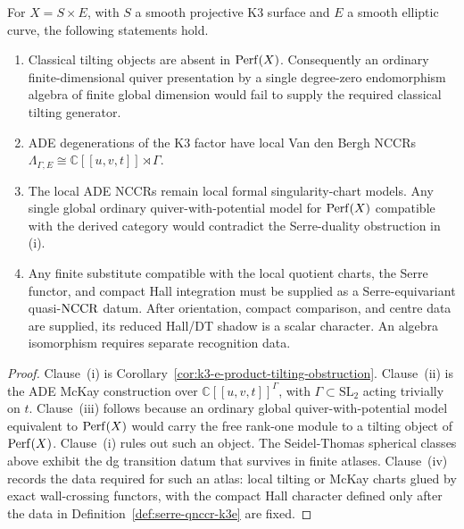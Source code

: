 \begin{theorem}
\label{thm:finite-quiver-obstruction-K3E}
For \(X=S\times E\), with \(S\) a smooth projective K3 surface and
\(E\) a smooth elliptic curve, the following statements hold.
\begin{enumerate}
\item[\textup{(i)}] Classical tilting objects are absent in
\(\mathrm{Perf}(X)\).  Consequently an ordinary finite-dimensional quiver
presentation by a single degree-zero endomorphism algebra of finite
global dimension would fail to supply the required classical tilting
generator.
\item[\textup{(ii)}] ADE degenerations of the K3 factor have local
Van den Bergh NCCRs
\(\Lambda_{\Gamma,E}\cong \mathbb C[[u,v,t]]\rtimes\Gamma\).
\item[\textup{(iii)}] The local ADE NCCRs remain local formal
singularity-chart models. Any single global ordinary
quiver-with-potential model for \(\mathrm{Perf}(X)\) compatible with the
derived category would
contradict the Serre-duality obstruction in (i).
\item[\textup{(iv)}] Any finite substitute compatible with the local
quotient charts, the Serre functor, and compact Hall integration must
be supplied as a Serre-equivariant quasi-\(\mathrm{NCCR}\) datum.  After
orientation, compact comparison, and centre data are supplied, its
reduced Hall/DT shadow is a scalar character.  An algebra isomorphism
requires separate recognition data.
\end{enumerate}
\end{theorem}

\begin{proof}
Clause~(i) is Corollary~\ref{cor:k3-e-product-tilting-obstruction}.
Clause~(ii) is the ADE McKay construction over
\(\mathbb C[[u,v,t]]^\Gamma\), with \(\Gamma\subset\mathrm{SL}_2\)
acting trivially on \(t\).  Clause~(iii) follows because an ordinary
global quiver-with-potential model equivalent to \(\mathrm{Perf}(X)\) would
carry the free rank-one module to a tilting object of \(\mathrm{Perf}(X)\).
Clause~(i) rules out such an object.  The Seidel-Thomas spherical
classes above exhibit the dg transition datum that survives in finite
atlases.  Clause~(iv) records the data required for such an atlas:
local tilting or McKay charts glued by exact wall-crossing functors,
with the compact Hall character defined only after the data in
Definition~\ref{def:serre-qnccr-k3e} are fixed.
\end{proof}

